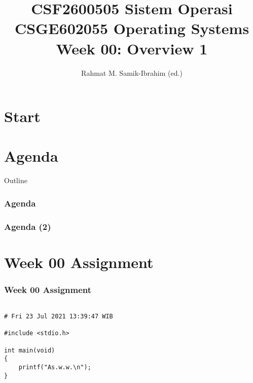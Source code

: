 \documentclass[xcolor=table, notheorems, hyperref={pdfpagelabels=false}]{beamer}
\title[\kopikopi]
{CSF2600505 Sistem Operasi   \\
CSGE602055 Operating Systems \\ 
Week 00:
Overview 1}
\author{Rahmat M. Samik-Ibrahim (ed.)}
\institute[UI]
{
University of Indonesia\\ 
\medskip
\url{https://os.vlsm.org/Slides/os00.pdf}
\\ \texttt{Always check for the latest revision!}
}
\date{\revision}
\begin{document}
\lstset{
basicstyle=\ttfamily\tiny, %
breakatwhitespace=true,
language=C,
columns=fullflexible,
keepspaces=true,
breaklines=true,
tabsize=3, 
showstringspaces=false,
extendedchars=true}

\section{Start}
\begin{frame}
\titlepage
\end{frame}


\label{laman}


\section{Agenda}
\begin{frame}{Outline}
  \frametitle{Agenda}
  \tableofcontents[sections={1-3}]
\end{frame}
\begin{frame}
   \frametitle{Agenda (2)}
   \tableofcontents[sections={4-}]
\end{frame}

\section{Week 00 Assignment}
\begin{frame}[fragile]
\frametitle{Week 00 Assignment}
\begin{lstlisting}[basicstyle=\ttfamily\large]

# Fri 23 Jul 2021 13:39:47 WIB

#include <stdio.h>

int main(void)
{
    printf("As.w.w.\n");
}

\end{lstlisting}
\end{frame}




\end{document}
